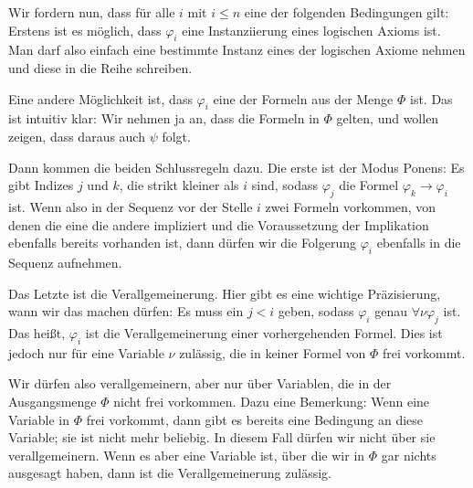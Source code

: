 \begin{spoken-clean}[00:21:34 - 00:23:48]
Wir fordern nun, dass für alle $i$ mit $i \le n$ eine der folgenden Bedingungen gilt: Erstens ist es möglich, dass $\varphi_i$ eine Instanziierung eines logischen Axioms ist. Man darf also einfach eine bestimmte Instanz eines der logischen Axiome nehmen und diese in die Reihe schreiben.

Eine andere Möglichkeit ist, dass $\varphi_i$ eine der Formeln aus der Menge $\Phi$ ist. Das ist intuitiv klar: Wir nehmen ja an, dass die Formeln in $\Phi$ gelten, und wollen zeigen, dass daraus auch $\psi$ folgt.

Dann kommen die beiden Schlussregeln dazu. Die erste ist der Modus Ponens: Es gibt Indizes $j$ und $k$, die strikt kleiner als $i$ sind, sodass $\varphi_j$ die Formel $\varphi_k \to \varphi_i$ ist. Wenn also in der Sequenz vor der Stelle $i$ zwei Formeln vorkommen, von denen die eine die andere impliziert und die Voraussetzung der Implikation ebenfalls bereits vorhanden ist, dann dürfen wir die Folgerung $\varphi_i$ ebenfalls in die Sequenz aufnehmen.
\end{spoken-clean}

\begin{spoken-clean}[00:23:48 - 00:25:54]
Das Letzte ist die Verallgemeinerung. Hier gibt es eine wichtige Präzisierung, wann wir das machen dürfen: Es muss ein $j < i$ geben, sodass $\varphi_i$ genau $\forall \nu \varphi_j$ ist. Das heißt, $\varphi_i$ ist die Verallgemeinerung einer vorhergehenden Formel. Dies ist jedoch nur für eine Variable $\nu$ zulässig, die in keiner Formel von $\Phi$ frei vorkommt.

Wir dürfen also verallgemeinern, aber nur über Variablen, die in der Ausgangsmenge $\Phi$ nicht frei vorkommen. Dazu eine Bemerkung: Wenn eine Variable in $\Phi$ frei vorkommt, dann gibt es bereits eine Bedingung an diese Variable; sie ist nicht mehr beliebig. In diesem Fall dürfen wir nicht über sie verallgemeinern. Wenn es aber eine Variable ist, über die wir in $\Phi$ gar nichts ausgesagt haben, dann ist die Verallgemeinerung zulässig.
\end{spoken-clean}

